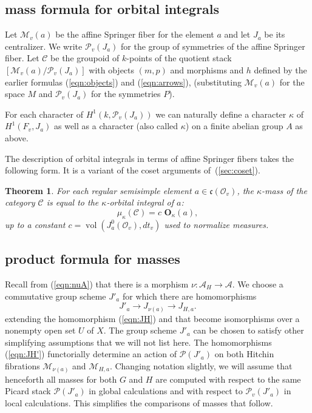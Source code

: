 \documentclass[brochure,english,12pt]{bourbaki}
\theoremstyle{plain}
\newtheorem{theorem}[equation]{Theorem}
\def\op#1{{\operatorname{#1}}}
\def\OO{{\mathbf O}}
\def\cc{\mathfrak{c}}
\def\A{{\mathcal A}}
\def\C{{\mathcal C}}
\def\M{{\mathcal M}}
\def\P{{\mathcal P}}
\def\O{{\mathcal O}}
\begin{document}
\subsection{mass formula for orbital integrals}


Let $\M_v(a)$ be the affine Springer fiber for the element $a$ and let
$J_a$ be its centralizer.  We write $\P_v(J_a)$ for the group of
symmetries of the affine Springer fiber.   Let $\C$ be the groupoid of $k$-points of
the quotient stack $[\M_v(a)/\P_v(J_a)]$ with objects $(m,p)$ and morphisms
and $h$ defined by the earlier formulas (\ref{eqn:objects}) and (\ref{eqn:arrows}),
(substituting $\M_v(a)$ for the space $M$ and $\P_v(J_a)$ for the symmetries $P$).

For each character of $H^1(k,\P_v(J_a))$ we can naturally define a
character $\kappa$ of $H^1(F_v,J_a)$ as well as a character (also
called $\kappa$) on a finite abelian group $A$ as above.

The description of orbital integrals in terms of affine Springer fibers
 takes the following form.  It is a variant of the coset arguments of~(\ref{sec:coset}).


\begin{theorem}\label{lemma:orbital-mass}
For each regular semisimple element $a\in \cc(\O_v)$, 
the $\kappa$-mass of the category $\C$ is equal to the
$\kappa$-orbital integral of $a$:
\[
\mu_\kappa(\C) = c\,\, \OO_\kappa(a),
\]
up to a constant $c=\op{vol}(J^0_a(\O_v),dt_v)$ used to normalize measures.
\end{theorem}





\subsection{product formula for masses} 



Recall from (\ref{eqn:nuA}) that there is a morphism $\nu:\A_H\to\A$.
We choose a commutative group scheme $J'_a$
for which there are homomorphisms
\begin{equation}\label{eqn:JH'}
J'_a \to J_{\nu(a)} \to J_{H,a}.
\end{equation}
extending the homomorphism (\ref{eqn:JH}) and that become isomorphisms
over a nonempty open set $U$ of $X$.  The group scheme $J'_a$ can be
chosen to satisfy other simplifying assumptions that we will not list
here.  The homomorphisms (\ref{eqn:JH'}) functorially determine an
action of $\P(J'_a)$ on both Hitchin fibrations $\M_{\nu(a)}$ and
$\M_{H,a}$.  Changing notation slightly, we will assume that
henceforth all masses for both $G$ and $H$ are computed with respect
to the same Picard stack $\P(J'_a)$ in global calculations and with respect to
$\P_v(J'_a)$ in local calculations.  This simplifies the comparisons
of masses that follow.
\end{document}
